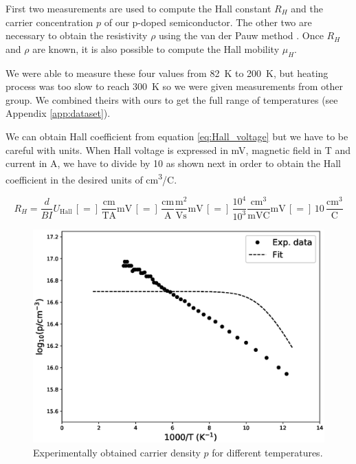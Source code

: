 \documentclass[11pt,a4paper]{article}
\begin{document}
First two measurements are used to compute the Hall constant $R_H$ and the carrier concentration $p$ of our p-doped semiconductor. The other two are necessary to obtain the resistivity $\rho$ using the van der Pauw method \cite{vdP}. Once $R_H$ and $\rho$ are known, it is also possible to compute the Hall mobility $\mu_H$.

We were able to measure these four values from \SI{82}{\kelvin} to \SI{200}{\kelvin}, but heating process was too slow to reach \SI{300}{\kelvin} so we were given measurements from other group. We combined theirs with ours to get the full range of temperatures (see Appendix \ref{app:dataset}).

We can obtain Hall coefficient from equation \eqref{eq:Hall_voltage} but we have to be careful with units. When Hall voltage is expressed in \si{\milli\volt}, magnetic field in \si{\tesla} and current in \si{\ampere}, we have to divide by 10 as shown next in order to obtain the Hall coefficient in the desired units of \si{\centi\meter^3/\coulomb}.

\begin{equation*}
R_H=\frac{d}{BI}U_\text{Hall}\,[=]\,\frac{\si{\centi\meter}}{\si{\tesla\ampere}}\si{\milli\volt}\,[=]\,\frac{\si{\centi\meter}}{\si{\ampere}}\frac{\si{\meter^2}}{\si{\volt\second}}\si{\milli\volt}\,[=]\,\frac{10^4}{10^3}\frac{\si{\centi\meter^3}}{\si{\milli\volt\coulomb}}\si{\milli\volt}\,[=]\,10\,\frac{\si{\centi\meter^3}}{\si{\coulomb}}
\end{equation*}

\begin{figure}[H]
\centering
\includegraphics[width=.8\textwidth]{carrier_density.eps}
\caption{Experimentally obtained carrier density $p$ for different temperatures.}
\label{fig:carrier_density}
\end{figure}
\end{document}

